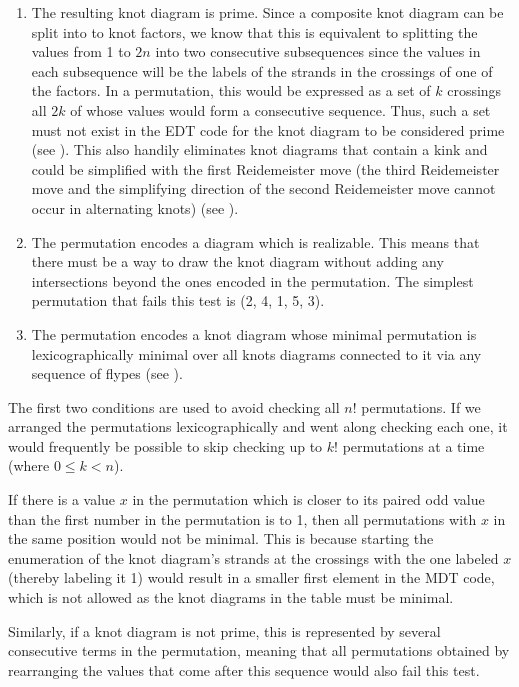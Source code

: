 \begin{paper}
\begin{enumerate}
\item The resulting knot diagram is prime.
Since a composite knot diagram can be split into to knot factors, we know that
this is equivalent to splitting the values from 1 to $2n$ into two consecutive
subsequences since the values in each subsequence will be the labels of the
strands in the crossings of one of the factors.
In a permutation, this would be expressed as a set of $k$ crossings all $2k$ of
whose values would form a consecutive sequence.
Thus, such a set must not exist in the EDT code for the knot diagram to be
considered prime (see \figComposite).
This also handily eliminates knot diagrams that contain a kink and could be
simplified with the first Reidemeister move (the third Reidemeister move and the
simplifying direction of the second Reidemeister move cannot occur in
alternating knots) (see \figMoves).

\item The permutation encodes a diagram which is realizable.
This means that there must be a way to draw the knot diagram without adding any
intersections beyond the ones encoded in the permutation.
The simplest permutation that fails this test is (2, 4, 1, 5, 3).

\item The permutation encodes a knot diagram whose minimal permutation is
lexicographically minimal over all knots diagrams connected to it via any
sequence of flypes (see \figMoves).
\end{enumerate}


The first two conditions are used to avoid checking all $n!$ permutations.
If we arranged the permutations lexicographically and went along checking each
one, it would frequently be possible to skip checking up to $k!$ permutations at
a time (where $0\leq k<n$).

If there is a value $x$ in the permutation which is closer to its paired odd
value than the first number in the permutation is to 1, then all permutations
with $x$ in the same position would not be minimal.
This is because starting the enumeration of the knot diagram's strands at the
crossings with the one labeled $x$ (thereby labeling it 1) would result in a
smaller first element in the MDT code, which is not allowed as the knot diagrams
in the table must be minimal.


Similarly, if a knot diagram is not prime, this is represented by several
consecutive terms in the permutation, meaning that all permutations obtained by
rearranging the values that come after this sequence would also fail this test.


\end{paper}

